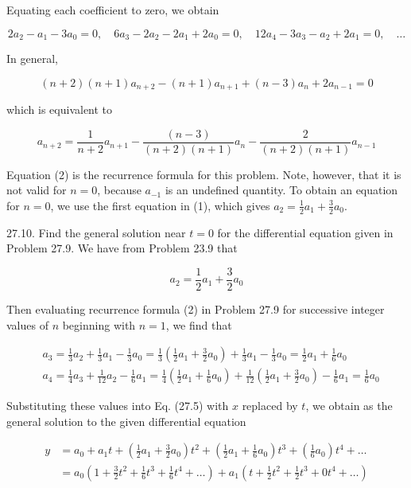 \documentclass[10pt]{article}
\begin{document}
Equating each coefficient to zero, we obtain


\begin{equation*}
2 a_{2}-a_{1}-3 a_{0}=0, \quad 6 a_{3}-2 a_{2}-2 a_{1}+2 a_{0}=0, \quad 12 a_{4}-3 a_{3}-a_{2}+2 a_{1}=0, \quad \ldots \tag{1}
\end{equation*}


In general,

$$
(n+2)(n+1) a_{n+2}-(n+1) a_{n+1}+(n-3) a_{n}+2 a_{n-1}=0
$$

which is equivalent to


\begin{equation*}
a_{n+2}=\frac{1}{n+2} a_{n+1}-\frac{(n-3)}{(n+2)(n+1)} a_{n}-\frac{2}{(n+2)(n+1)} a_{n-1} \tag{2}
\end{equation*}


Equation (2) is the recurrence formula for this problem. Note, however, that it is not valid for $n=0$, because $a_{-1}$ is an undefined quantity. To obtain an equation for $n=0$, we use the first equation in (1), which gives $a_{2}=\frac{1}{2} a_{1}+\frac{3}{2} a_{0}$.

27.10. Find the general solution near $t=0$ for the differential equation given in Problem 27.9. We have from Problem 23.9 that

$$
a_{2}=\frac{1}{2} a_{1}+\frac{3}{2} a_{0}
$$

Then evaluating recurrence formula (2) in Problem 27.9 for successive integer values of $n$ beginning with $n=1$, we find that

$$
\begin{aligned}
& a_{3}=\frac{1}{3} a_{2}+\frac{1}{3} a_{1}-\frac{1}{3} a_{0}=\frac{1}{3}\left(\frac{1}{2} a_{1}+\frac{3}{2} a_{0}\right)+\frac{1}{3} a_{1}-\frac{1}{3} a_{0}=\frac{1}{2} a_{1}+\frac{1}{6} a_{0} \\
& a_{4}=\frac{1}{4} a_{3}+\frac{1}{12} a_{2}-\frac{1}{6} a_{1}=\frac{1}{4}\left(\frac{1}{2} a_{1}+\frac{1}{6} a_{0}\right)+\frac{1}{12}\left(\frac{1}{2} a_{1}+\frac{3}{2} a_{0}\right)-\frac{1}{6} a_{1}=\frac{1}{6} a_{0}
\end{aligned}
$$

Substituting these values into Eq. (27.5) with $x$ replaced by $t$, we obtain as the general solution to the given differential equation

$$
\begin{aligned}
y & =a_{0}+a_{1} t+\left(\frac{1}{2} a_{1}+\frac{3}{2} a_{0}\right) t^{2}+\left(\frac{1}{2} a_{1}+\frac{1}{6} a_{0}\right) t^{3}+\left(\frac{1}{6} a_{0}\right) t^{4}+\ldots \\
& =a_{0}\left(1+\frac{3}{2} t^{2}+\frac{1}{6} t^{3}+\frac{1}{6} t^{4}+\ldots\right)+a_{1}\left(t+\frac{1}{2} t^{2}+\frac{1}{2} t^{3}+0 t^{4}+\ldots\right)
\end{aligned}
$$
\end{document}
